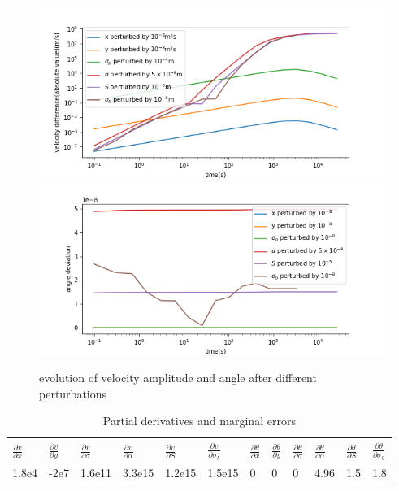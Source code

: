 \documentclass{article}
\begin{document}
	\begin{figure}[]
		\centering
		\includegraphics[width=12cm]{pert.png}
		\includegraphics[width=12cm]{pertang.png}
		
		\caption{evolution of velocity amplitude and angle  after different perturbations}
		\label{pert}
	\end{figure}
	
		\begin{table}[!htb]
		\centering
		\label{pd}
		\caption{Partial derivatives and marginal errors}
		\begin{tabular}{llllllllllll}
			\toprule
			$\frac{\partial v}{\partial x}$ &$\frac{\partial v}{\partial y}$ &$\frac{\partial v}{\partial \sigma}$ &$\frac{\partial v}{\partial \alpha}$ &$\frac{\partial v}{\partial S}$ &$\frac{\partial v}{\partial \sigma_b}$& $\frac{\partial \theta}{\partial x}$ &$\frac{\partial \theta}{\partial y}$ &$\frac{\partial \theta}{\partial \sigma}$ &$\frac{\partial \theta}{\partial \alpha}$ &$\frac{\partial \theta}{\partial S}$ &$\frac{\partial \theta}{\partial \sigma_b}$	\\
			\midrule
			1.8e4 &	-2e7	& 1.6e11	& 3.3e15	&1.2e15	& 1.5e15 &0&0	&0 &4.96 &1.5	&1.8	\\
			\bottomrule
		\end{tabular}

	\end{table}
	
\end{document}
